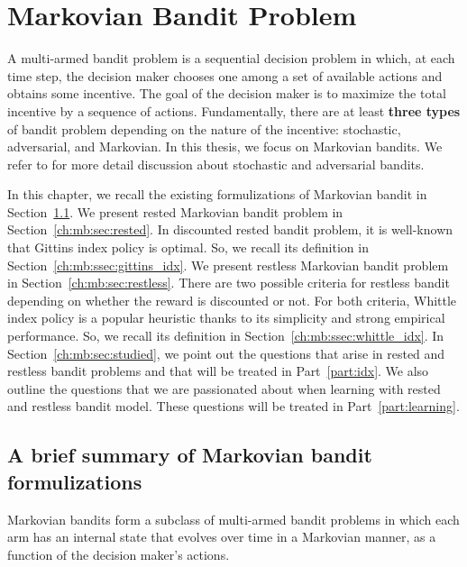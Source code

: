 \begingroup
\let\clearpage\relax

\chapter{Markovian Bandit Problem}
\label{ch:mb}

A multi-armed bandit problem is a sequential decision problem in which, at each time step, the decision maker chooses one among a set of available actions and obtains some incentive.
The goal of the decision maker is to maximize the total incentive by a sequence of actions.
Fundamentally, there are at least \textbf{three types} of bandit problem depending on the nature of the incentive: stochastic, adversarial, and Markovian.
In this thesis, we focus on Markovian bandits.
We refer to \cite{bubeck2012regret} for more detail discussion about stochastic and adversarial bandits.

In this chapter, we recall the existing formulizations of Markovian bandit in Section~\ref{ch:mb:sec:summary}.
We present rested Markovian bandit problem in Section~\ref{ch:mb:sec:rested}.
In discounted rested bandit problem, it is well-known that Gittins index policy is optimal.
So, we recall its definition in Section~\ref{ch:mb:ssec:gittins_idx}.
We present restless Markovian bandit problem in Section~\ref{ch:mb:sec:restless}.
There are two possible criteria for restless bandit depending on whether the reward is discounted or not.
For both criteria, Whittle index policy is a popular heuristic thanks to its simplicity and strong empirical performance.
So, we recall its definition in Section~\ref{ch:mb:ssec:whittle_idx}.
In Section~\ref{ch:mb:sec:studied}, we point out the questions that arise in rested and restless bandit problems and that will be treated in Part~\ref{part:idx}.
We also outline the questions that we are passionated about when learning with rested and restless bandit model.
These questions will be treated in Part~\ref{part:learning}.

\section{A brief summary of Markovian bandit formulizations}
\label{ch:mb:sec:summary}

Markovian bandits form a subclass of multi-armed bandit problems in which each arm has an internal state that evolves over time in a Markovian manner, as a function of the decision maker’s actions.

